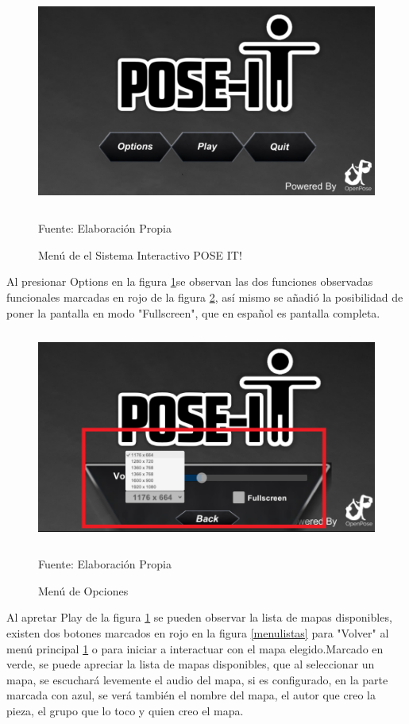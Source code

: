 \begin{figure}[h!]
	\centering
	\includegraphics[width=12cm,height=7cm]{./Images/menu.png}
	\caption{Menú de el Sistema Interactivo POSE IT!}
	\footnotesize Fuente: Elaboración Propia
	\label{menu}
\end{figure}

Al presionar Options en la figura \ref{menu}se observan las dos funciones observadas funcionales marcadas en rojo de la figura \ref{menuoptions}, así mismo se añadió la posibilidad de poner la pantalla en modo "Fullscreen", que en español es pantalla completa.

\begin{figure}[t!]
	\centering
	\includegraphics[width=12cm,height=7cm]{./Images/menuopciones.png}
	\caption{Menú de Opciones}
	\footnotesize Fuente: Elaboración Propia
	\label{menuoptions}
\end{figure}

Al apretar Play de la figura \ref{menu} se pueden observar la lista de mapas disponibles, existen dos botones marcados en rojo en la figura \ref{menulistas} para "Volver" al menú principal \ref{menu} o para iniciar a interactuar con el mapa elegido.Marcado en verde, se puede apreciar la lista de mapas disponibles, que al seleccionar un mapa, se escuchará levemente el audio del mapa, si es configurado, en la parte marcada con azul, se verá también el nombre del mapa, el autor que creo la pieza, el grupo que lo toco y quien creo el mapa.

